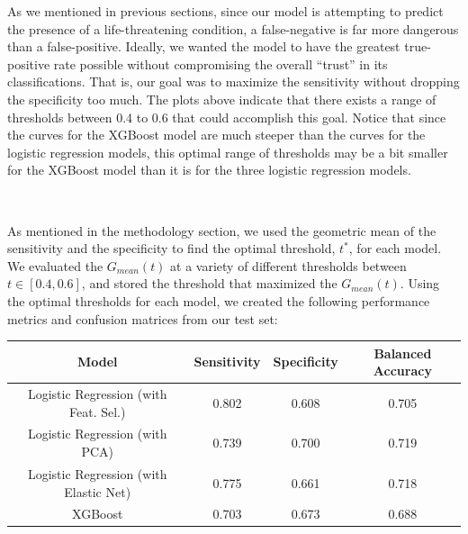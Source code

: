 \documentclass[10pt]{article}
\begin{document}
As we mentioned in previous sections, since our model is attempting to predict the presence of a life-threatening condition, a false-negative is far more dangerous than a false-positive. Ideally, we wanted the model to have the greatest true-positive rate possible without compromising the overall “trust” in its classifications. That is, our goal was to maximize the sensitivity without dropping the specificity too much. The plots above indicate that there exists a range of thresholds between 0.4 to 0.6 that could accomplish this goal. Notice that since the curves for the XGBoost model are much steeper than the curves for the logistic regression models, this optimal range of thresholds may be a bit smaller for the XGBoost model than it is for the three logistic regression models.

\

As mentioned in the methodology section, we used the geometric mean of the sensitivity and the specificity to find the optimal threshold, $t^*$, for each model. We evaluated the $G_{mean}(t)$ at a variety of different thresholds between $t \in [0.4, 0.6]$, and stored the threshold that maximized the $G_{mean}(t)$. Using the optimal thresholds for each model, we created the following performance metrics and confusion matrices from our test set:

\begin{table}[h!]
\centering
\begin{tabular}{| c | c | c | c | } 
\hline
Model & Sensitivity & Specificity & Balanced Accuracy \\ 
\hline
\hline
Logistic Regression (with Feat. Sel.) & 0.802 & 0.608 & 0.705\\
\hline
Logistic Regression (with PCA) & 0.739 & 0.700 & 0.719\\
\hline
Logistic Regression (with Elastic Net) & 0.775 & 0.661 & 0.718\\
\hline  
XGBoost & 0.703 & 0.673 & 0.688\\
\hline  
\end{tabular}
\end{table}
\end{document}
